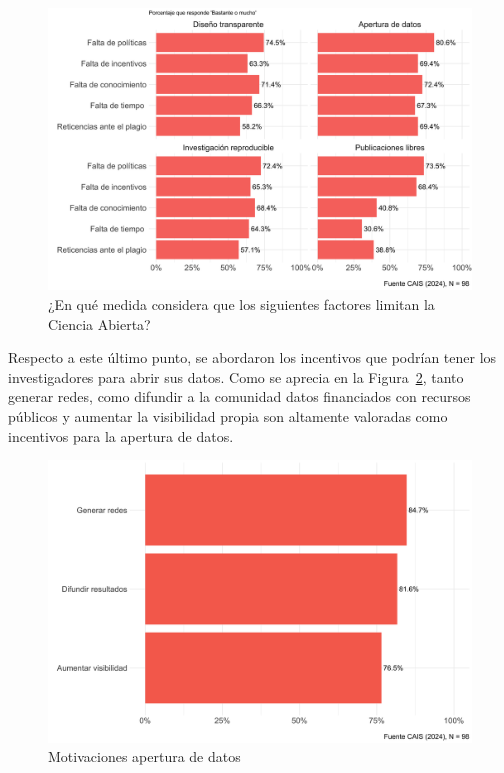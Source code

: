 \documentclass[
  letterpaper,
  DIV=11,
  numbers=noendperiod]{scrreprt}
\begin{document}
\begin{figure}

{\centering \includegraphics{paper_files/figure-pdf/fig-barreras-1.png}

}

\caption{\label{fig-barreras}¿En qué medida considera que los siguientes
factores limitan la Ciencia Abierta?}

\end{figure}

Respecto a este último punto, se abordaron los incentivos que podrían
tener los investigadores para abrir sus datos. Como se aprecia en la
Figura~\ref{fig-motivaciones}, tanto generar redes, como difundir a la
comunidad datos financiados con recursos públicos y aumentar la
visibilidad propia son altamente valoradas como incentivos para la
apertura de datos.

\begin{figure}

{\centering \includegraphics{paper_files/figure-pdf/fig-motivaciones-1.png}

}

\caption{\label{fig-motivaciones}Motivaciones apertura de datos}

\end{figure}
\end{document}
